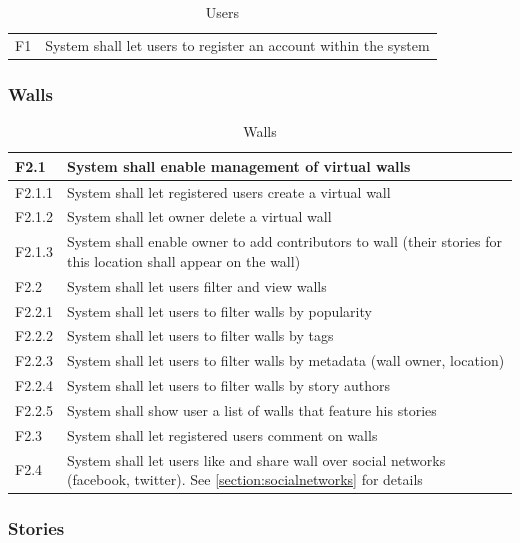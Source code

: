 \documentclass[11pt]{book}
\begin{document}
\begin{table}[H]
\centering
\begin{tabular}{ l  p{11cm} }
F1 & System shall let users to register an account within the system\\
\end{tabular}
\label{tab:requirements_users}
\caption{Users}
\end{table}

\subsubsection{Walls}

\begin{table}[H]
\centering
\begin{tabular}{ l  p{11cm} }
F2.1 & System shall enable management of virtual walls\\
\hline
F2.1.1 & System shall let registered users create a virtual wall\\
\hline
F2.1.2 & System shall let owner delete a virtual wall\\
\hline
F2.1.3 & System shall enable owner to add contributors to wall (their stories for this location shall appear on the wall)\\
\hline
F2.2 & System shall let users filter and view walls\\
\hline
F2.2.1 & System shall let users to filter walls by popularity\\
\hline
F2.2.2 & System shall let users to filter walls by tags\\
\hline
F2.2.3 & System shall let users to filter walls by metadata (wall owner, location)\\
\hline
F2.2.4 & System shall let users to filter walls by story authors\\
\hline
F2.2.5 & System shall show user a list of walls that feature his stories\\
\hline
F2.3 & System shall let registered users comment on walls\\
\hline
F2.4 & System shall let users like and share wall over social networks (facebook, twitter). See \ref{section:socialnetworks} for details

\end{tabular}
\label{tab:requirements_walls}
\caption{Walls}
\end{table}

\subsubsection{Stories}
\end{document}
